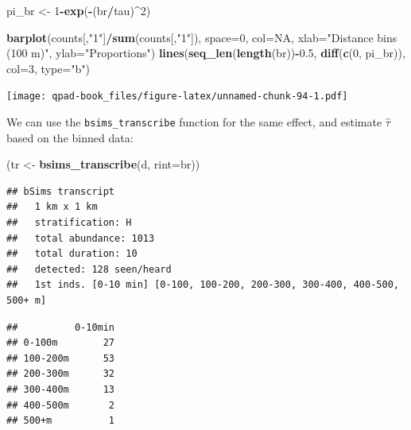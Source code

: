 \documentclass[12pt,]{book}
\newenvironment{Shaded}{\begin{snugshade}}{\end{snugshade}}
\newcommand{\DataTypeTok}[1]{\textcolor[rgb]{0.13,0.29,0.53}{#1}}
\newcommand{\DecValTok}[1]{\textcolor[rgb]{0.00,0.00,0.81}{#1}}
\newcommand{\FloatTok}[1]{\textcolor[rgb]{0.00,0.00,0.81}{#1}}
\newcommand{\KeywordTok}[1]{\textcolor[rgb]{0.13,0.29,0.53}{\textbf{#1}}}
\newcommand{\NormalTok}[1]{#1}
\newcommand{\OperatorTok}[1]{\textcolor[rgb]{0.81,0.36,0.00}{\textbf{#1}}}
\newcommand{\OtherTok}[1]{\textcolor[rgb]{0.56,0.35,0.01}{#1}}
\newcommand{\StringTok}[1]{\textcolor[rgb]{0.31,0.60,0.02}{#1}}
\begin{document}
\begin{Shaded}
\begin{Highlighting}[]
\NormalTok{pi_br <-}\StringTok{ }\DecValTok{1}\OperatorTok{-}\KeywordTok{exp}\NormalTok{(}\OperatorTok{-}\NormalTok{(br}\OperatorTok{/}\NormalTok{tau)}\OperatorTok{^}\DecValTok{2}\NormalTok{)}

\KeywordTok{barplot}\NormalTok{(counts[,}\StringTok{"1"}\NormalTok{]}\OperatorTok{/}\KeywordTok{sum}\NormalTok{(counts[,}\StringTok{"1"}\NormalTok{]), }\DataTypeTok{space=}\DecValTok{0}\NormalTok{, }\DataTypeTok{col=}\OtherTok{NA}\NormalTok{,}
  \DataTypeTok{xlab=}\StringTok{"Distance bins (100 m)"}\NormalTok{, }\DataTypeTok{ylab=}\StringTok{"Proportions"}\NormalTok{)}
\KeywordTok{lines}\NormalTok{(}\KeywordTok{seq_len}\NormalTok{(}\KeywordTok{length}\NormalTok{(br))}\OperatorTok{-}\FloatTok{0.5}\NormalTok{, }\KeywordTok{diff}\NormalTok{(}\KeywordTok{c}\NormalTok{(}\DecValTok{0}\NormalTok{, pi_br)), }\DataTypeTok{col=}\DecValTok{3}\NormalTok{, }\DataTypeTok{type=}\StringTok{"b"}\NormalTok{)}
\end{Highlighting}
\end{Shaded}

\texttt{[image: qpad-book\_files/figure-latex/unnamed-chunk-94-1.pdf]}

We can use the \texttt{bsims\_transcribe} function for the same effect,
and estimate \(\hat{\tau}\) based on the binned data:

\begin{Shaded}
\begin{Highlighting}[]
\NormalTok{(tr <-}\StringTok{ }\KeywordTok{bsims_transcribe}\NormalTok{(d, }\DataTypeTok{rint=}\NormalTok{br))}
\end{Highlighting}
\end{Shaded}

\begin{verbatim}
## bSims transcript
##   1 km x 1 km
##   stratification: H
##   total abundance: 1013
##   total duration: 10
##   detected: 128 seen/heard
##   1st inds. [0-10 min] [0-100, 100-200, 200-300, 300-400, 400-500, 500+ m]
\end{verbatim}

\begin{Shaded}
\end{Shaded}

\begin{verbatim}
##          0-10min
## 0-100m        27
## 100-200m      53
## 200-300m      32
## 300-400m      13
## 400-500m       2
## 500+m          1
\end{verbatim}
\end{document}
